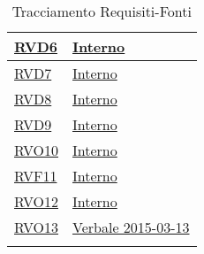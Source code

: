 \begin{longtable}{|>{\centering}m{5cm}|m{5cm}<{\centering}|}
\hyperlink{RVD6}{RVD6} & \hyperlink{Interno}{Interno}\\ \hline
\hyperlink{RVD7}{RVD7} & \hyperlink{Interno}{Interno}\\ \hline
\hyperlink{RVD8}{RVD8} & \hyperlink{Interno}{Interno}\\ \hline
\hyperlink{RVD9}{RVD9} & \hyperlink{Interno}{Interno}\\ \hline
\hyperlink{RVO10}{RVO10} & \hyperlink{Interno}{Interno}\\ \hline
\hyperlink{RVF11}{RVF11} & \hyperlink{Interno}{Interno}\\ \hline
\hyperlink{RVO12}{RVO12} & \hyperlink{Interno}{Interno}\\ \hline
\hyperlink{RVO13}{RVO13} & \hyperlink{Verbale 2015-03-13}{Verbale 2015-03-13}\\ \hline
\caption[Tracciamento Requisiti-Fonti]{Tracciamento Requisiti-Fonti}
\label{tabella:requi-fonti}
\end{longtable}
\clearpage
